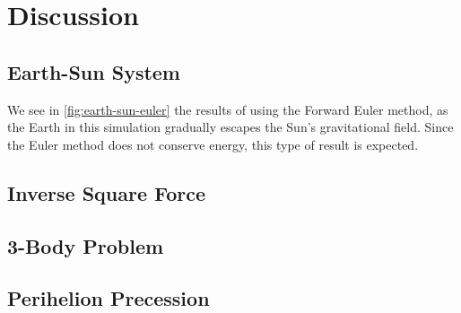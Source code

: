 \documentclass[../main.tex]{subfiles}
\begin{document}
\section{Discussion}\label{sec:discussion}

\subsection{Earth-Sun System}

We see in \cref{fig:earth-sun-euler} the results of using the Forward Euler method, as the Earth in this simulation gradually escapes the Sun's gravitational field. Since the Euler method does not conserve energy, this type of result is expected.

\subsection{Inverse Square Force}

\subsection{3-Body Problem}

\subsection{Perihelion Precession}
\end{document}
